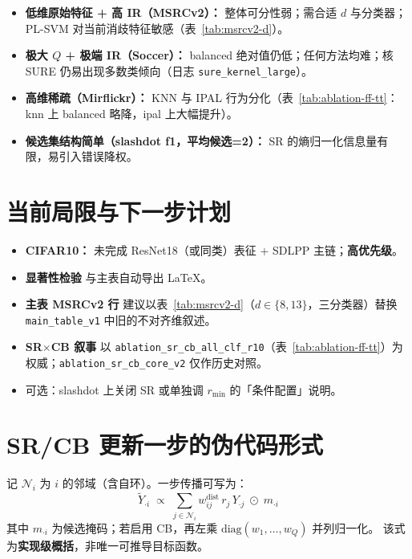 \documentclass[11pt,a4paper]{article}
\begin{document}
\begin{itemize}
  \item \textbf{低维原始特征 + 高 IR（MSRCv2）：} 整体可分性弱；需合适 $d$ 与分类器；PL-SVM 对当前消歧特征敏感（表~\ref{tab:msrcv2-d}）。
  \item \textbf{极大 $Q$ + 极端 IR（Soccer）：} balanced 绝对值仍低；任何方法均难；核 SURE 仍易出现多数类倾向（日志 \texttt{sure\_kernel\_large}）。
  \item \textbf{高维稀疏（Mirflickr）：} KNN 与 IPAL 行为分化（表~\ref{tab:ablation-ff-tt}：knn 上 balanced 略降，ipal 上大幅提升）。
  \item \textbf{候选集结构简单（slashdot f1，平均候选=2）：} SR 的熵归一化信息量有限，易引入错误降权。
\end{itemize}

\section{当前局限与下一步计划}

\begin{itemize}
  \item \textbf{CIFAR10：} 未完成 ResNet18（或同类）表征 + SDLPP 主链；\textbf{高优先级}。
  \item \textbf{显著性检验} 与主表自动导出 LaTeX。
  \item \textbf{主表 MSRCv2 行} 建议以表~\ref{tab:msrcv2-d}（$d{\in}\{8,13\}$，三分类器）替换 \texttt{main\_table\_v1} 中旧的不对齐维叙述。
  \item \textbf{SR$\times$CB 叙事} 以 \texttt{ablation\_sr\_cb\_all\_clf\_r10}（表~\ref{tab:ablation-ff-tt}）为权威；\texttt{ablation\_sr\_cb\_core\_v2} 仅作历史对照。
  \item 可选：slashdot 上关闭 SR 或单独调 $r_{\min}$ 的「条件配置」说明。
\end{itemize}

\appendix
\section{SR/CB 更新一步的伪代码形式}

记 $\mathcal{N}_i$ 为 $i$ 的邻域（含自环）。一步传播可写为：
\begin{equation}
\tilde{Y}_{\cdot i} \;\propto\; \sum_{j \in \mathcal{N}_i} w^{\mathrm{dist}}_{ij}\, r_j\, Y_{\cdot j}
\;\odot\; m_{\cdot i}
\end{equation}
其中 $m_{\cdot i}$ 为候选掩码；若启用 CB，再左乘 $\mathrm{diag}(w_1,\ldots,w_Q)$ 并列归一化。
该式为\textbf{实现级概括}，非唯一可推导目标函数。
\end{document}
